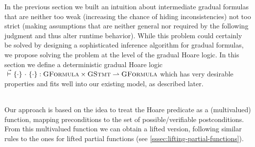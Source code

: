 %
%
%
%

In the previous section we built an intuition about intermediate gradual formulas that are neither too weak (increasing the chance of hiding inconsistencies) not too strict (making assumptions that are neither general nor required by the following judgment and thus alter runtime behavior).
While this problem could certainly be solved by designing a sophisticated inference algorithm for gradual formulas, we propose solving the problem at the level of the gradual Hoare logic.
In this section we define a deterministic gradual Hoare logic ${} \,\,\vec{\vdash}\,\, \{{\cdot}\} ~{\cdot}~ \{{\cdot}\} : \textup{\textsc{GFormula}} \times \textup{\textsc{GStmt}} \rightharpoonup \textup{\textsc{GFormula}}$ which has very desirable properties and fits well into our existing model, as described later.

~\\
Our approach is based on the idea to treat the Hoare predicate as a (multivalued) function, mapping preconditions to the set of possible/verifiable postconditions.
From this multivalued function we can obtain a lifted version, following similar rules to the ones for lifted partial functions (see \ref{sssec:lifting-partial-functions}).

